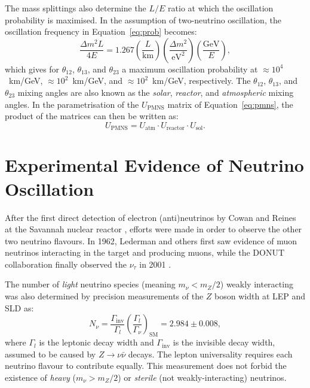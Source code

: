The mass splittings also determine the $L/E$ ratio at which the oscillation probability is maximised. In the assumption of two-neutrino oscillation, the oscillation frequency in Equation~\ref{eq:prob} becomes:
\begin{equation}
     \frac{\Delta m^{2}L}{4E} = 1.267\left(\frac{L}{\mathrm{km}}\right)\left(\frac{\Delta m^2}{\mathrm{eV}^2}\right)\left(\frac{\mathrm{GeV}}{E}\right),
\end{equation} 
which gives for $\theta_{12}$, $\theta_{13}$, and $\theta_{23}$ a maximum oscillation probability at $\approx 10^4$~km/GeV, $\approx 10^2$~km/GeV, and $\approx 10^2$~km/GeV, respectively. The $\theta_{12}$, $\theta_{13}$, and $\theta_{23}$ mixing angles are also known as the \emph{solar}, \emph{reactor}, and \emph{atmospheric} mixing angles. In the parametrisation of the $U_{\mathrm{PMNS}}$ matrix of Equation~\ref{eq:pmns}, the product of the matrices can then be written as:
\begin{equation}
    U_{\mathrm{PMNS}} = U_{\mathrm{atm}} \cdot U_{\mathrm{reactor}} \cdot U_{\mathrm{sol}}.
\end{equation}



\section{Experimental Evidence of Neutrino Oscillation}
After the first direct detection of electron (anti)neutrinos by Cowan and Reines at the Savannah nuclear reactor \cite{Cowan:1992xc}, efforts were made in order to observe the other two neutrino flavours.
In 1962, Lederman and others \cite{PhysRevLett.9.36} first saw evidence of muon neutrinos interacting in the target and producing muons, while the DONUT collaboration finally observed the $\nu_{\tau}$ in 2001 \cite{Kodama:2000mp}.

The number of \emph{light} neutrino species (meaning $m_{\nu} < m_{Z}/2$) weakly interacting was also determined by precision measurements of the $Z$ boson width at LEP and SLD \cite{ALEPH:2005ab} as:
\begin{equation}
   N_{\nu} = \frac{\Gamma_{\mathrm{inv}}}{\Gamma_l}
   \left(\frac{\Gamma_{l}}{\Gamma_{\nu}}\right)_{\mathrm{SM}}=2.984\pm0.008,
\end{equation}
where $\Gamma_{l}$ is the leptonic decay width and $\Gamma_{\mathrm{inv}}$ is the invisible decay width, assumed to be caused by $Z\rightarrow\nu\bar{\nu}$ decays. The lepton universality requires each neutrino flavour to contribute equally. This measurement does not forbid the existence of \emph{heavy} ($m_{\nu} > m_{Z}/2$) or \emph{sterile} (not weakly-interacting) neutrinos.

